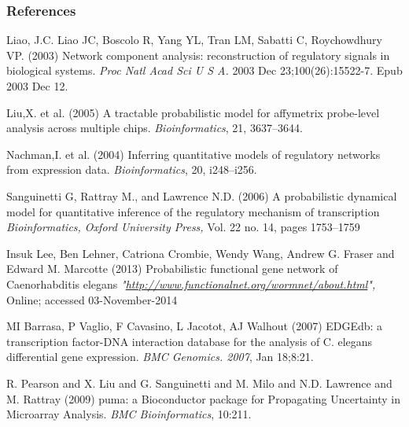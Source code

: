 \documentclass{beamer}
\begin{document}
\begin{frame}
\frametitle{References}
\footnotesize{
\begin{thebibliography}{70} %

 Liao, J.C. Liao JC, Boscolo R, Yang YL, Tran LM, Sabatti C, Roychowdhury VP. (2003)
\newblock Network component analysis: reconstruction of regulatory signals in biological systems.
\newblock \emph{Proc Natl Acad Sci U S A.} 2003 Dec 23;100(26):15522-7. Epub 2003 Dec 12.

 Liu,X. et al. (2005) 
\newblock A tractable probabilistic model for affymetrix probe-level analysis across multiple chips. 
\newblock \emph {Bioinformatics}, 21, 3637–3644.

Nachman,I. et al. (2004) \newblock Inferring quantitative models of regulatory networks from expression data. 
\newblock \emph{Bioinformatics}, 20, i248–i256.

 Sanguinetti G, Rattray M., and Lawrence N.D. (2006)
\newblock A probabilistic dynamical model for quantitative inference of the regulatory mechanism of transcription
\newblock \emph{Bioinformatics, Oxford University Press,} Vol. 22 no. 14, pages 1753–1759

 Insuk Lee, Ben Lehner, Catriona Crombie, Wendy Wang, Andrew G. Fraser and Edward M. Marcotte (2013)
\newblock Probabilistic functional gene network of Caenorhabditis elegans
\newblock \emph{"\url{http://www.functionalnet.org/wormnet/about.html}",} Online; accessed 03-November-2014

 MI Barrasa, P Vaglio, F Cavasino, L Jacotot, AJ Walhout (2007)
\newblock EDGEdb: a transcription factor-DNA interaction database for the analysis of C. elegans differential gene expression.
\newblock \emph{BMC Genomics. 2007}, Jan 18;8:21.

 R. Pearson and X. Liu and G. Sanguinetti and M. Milo and N.D. Lawrence and M. Rattray (2009) 
\newblock puma: a Bioconductor package for Propagating Uncertainty in Microarray Analysis. 
\newblock \emph {BMC Bioinformatics}, 10:211.

\end{thebibliography}
}
\end{frame}

\end{document}
